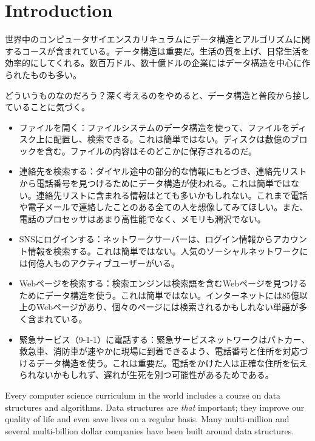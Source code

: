 \chapter{Introduction}

世界中のコンピュータサイエンスカリキュラムにデータ構造とアルゴリズムに関するコースが含まれている。データ構造は重要だ。生活の質を上げ、日常生活を効率的にしてくれる。数百万ドル、数十億ドルの企業にはデータ構造を中心に作られたものも多い。

どういうものなのだろう？深く考えるのをやめると、データ構造と普段から接していることに気づく。
\begin{itemize}
	\item ファイルを開く：ファイルシステムのデータ構造を使って、ファイルをディスク上に配置し、検索できる。これは簡単ではない。ディスクは数億のブロックを含む。ファイルの内容はそのどこかに保存されるのだ。
	\item 連絡先を検索する：ダイヤル途中の部分的な情報にもとづき、連絡先リストから電話番号を見つけるためにデータ構造が使われる。これは簡単ではない。連絡先リストに含まれる情報はとても多いかもしれない。これまで電話や電子メールで連絡したことのある全ての人を想像してみてほしい。また、電話のプロセッサはあまり高性能でなく、メモリも潤沢でない。
	\item SNSにログインする：ネットワークサーバーは、ログイン情報からアカウント情報を検索する。これは簡単ではない。人気のソーシャルネットワークには何億人ものアクティブユーザーがいる。
	\item Webページを検索する：検索エンジンは検索語を含むWebページを見つけるためにデータ構造を使う。これは簡単ではない。インターネットには85億以上のWebページがあり、個々のページには検索されるかもしれない単語が多く含まれている。
	\item 緊急サービス（9-1-1）に電話する：緊急サービスネットワークはパトカー、救急車、消防車が速やかに現場に到着できるよう、電話番号と住所を対応づけるデータ構造を使う。これは重要だ。電話をかけた人は正確な住所を伝えられないかもしれず、遅れが生死を別つ可能性があるためである。
\end{itemize}

Every computer science curriculum in the world includes a course on data structures and algorithms.  Data structures are \emph{that} important; they improve our quality of life and even save lives on a regular basis.  Many multi-million and several multi-billion dollar companies have been built around data structures.

